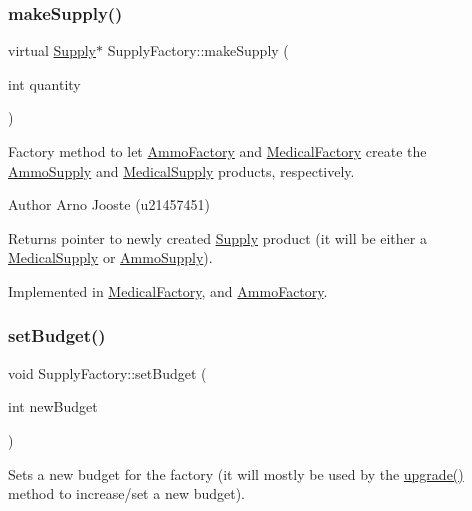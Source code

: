 \subsubsection{\texorpdfstring{makeSupply()}{makeSupply()}}
{\footnotesize\ttfamily virtual \mbox{\hyperlink{class_supply}{Supply}}$\ast$ Supply\+Factory\+::make\+Supply (\begin{DoxyParamCaption}\item[{int}]{quantity }\end{DoxyParamCaption})\hspace{0.3cm}{\ttfamily [pure virtual]}}



Factory method to let \mbox{\hyperlink{class_ammo_factory}{Ammo\+Factory}} and \mbox{\hyperlink{class_medical_factory}{Medical\+Factory}} create the \mbox{\hyperlink{class_ammo_supply}{Ammo\+Supply}} and \mbox{\hyperlink{class_medical_supply}{Medical\+Supply}} products, respectively. 

\begin{DoxyAuthor}{Author}
Arno Jooste (u21457451) 
\end{DoxyAuthor}
\begin{DoxyReturn}{Returns}
pointer to newly created \mbox{\hyperlink{class_supply}{Supply}} product (it will be either a \mbox{\hyperlink{class_medical_supply}{Medical\+Supply}} or \mbox{\hyperlink{class_ammo_supply}{Ammo\+Supply}}). 
\end{DoxyReturn}


Implemented in \mbox{\hyperlink{class_medical_factory_a323b36eb230b6b4e261dd2fed1164d5c}{Medical\+Factory}}, and \mbox{\hyperlink{class_ammo_factory_a8d2b1cb24f145547af1de2d051f0e02c}{Ammo\+Factory}}.

\mbox{\label{class_supply_factory_aa5d3ab719c7a296b8cfd2ca33eb833ba}} 
\subsubsection{\texorpdfstring{setBudget()}{setBudget()}}
{\footnotesize\ttfamily void Supply\+Factory\+::set\+Budget (\begin{DoxyParamCaption}\item[{int}]{new\+Budget }\end{DoxyParamCaption})}



Sets a new budget for the factory (it will mostly be used by the \mbox{\hyperlink{class_supply_factory_af3930f1f67a23500a56e52045d4c9f67}{upgrade()}} method to increase/set a new budget). 

